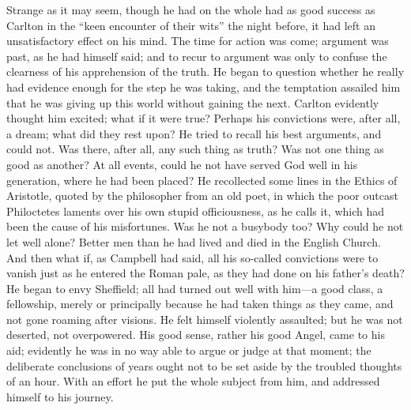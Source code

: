 Strange as it may seem, though he had on the whole had as good
success as Carlton in the ``keen encounter of their wits'' the
night before, it had left an unsatisfactory effect on his mind. The
time for action was come; argument was past, as he had himself said;
and to recur to argument was only to confuse the clearness of his
apprehension of the truth. He began to question whether he really had
evidence enough for the step he was taking, and the temptation
assailed him that he was giving up this world without gaining the
next. Carlton evidently thought him excited; what if it were true? Perhaps his convictions were, after all, a
dream; what did they rest upon? He tried to recall his best arguments,
and could not. Was there, after all, any such thing as truth? Was not
one thing as good as another? At all events, could he not have served
God well in his generation, where he had been placed? He recollected
some lines in the Ethics of Aristotle, quoted by the philosopher from
an old poet, in which the poor outcast Philoctetes laments over his
own stupid officiousness, as he calls it, which had been the cause of
his misfortunes. Was he not a busybody too? Why could he not let well
alone? Better men than he had lived and died in the English Church.
And then what if, as Campbell had said, all his so-called convictions
were to vanish just as he entered the Roman pale, as they had done on
his father's death? He began to envy Sheffield; all had turned out
well with him—a good class, a fellowship, merely or principally
because he had taken things as they came, and not gone roaming after
visions. He felt himself violently assaulted; but he was not deserted,
not overpowered. His good sense, rather his good Angel, came to his
aid; evidently he was in no way able to argue or judge at that moment;
the deliberate conclusions of years ought not to be set aside by the
troubled thoughts of an hour. With an effort he put the whole subject
from him, and addressed himself to his journey.

